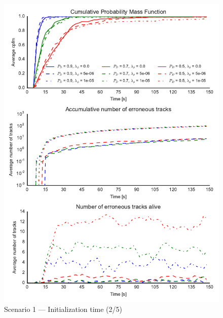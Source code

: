 \begin{figure}
\centering
\includegraphics{Figures/plots/Scenario1_Init-Time(2-5).pdf}
\caption{Scenario 1 --- Initialization time (2/5)}\label{fig:init1_time_2-5}
\end{figure}

